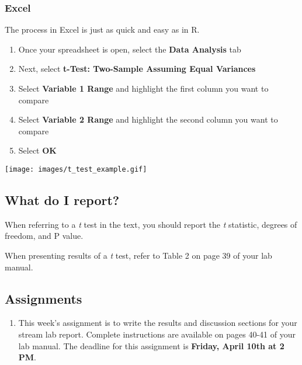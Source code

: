 \documentclass[]{book}
\providecommand{\tightlist}{%
  \setlength{\itemsep}{0pt}\setlength{\parskip}{0pt}}
\begin{document}
\subsubsection{Excel}\label{excel}

The process in Excel is just as quick and easy as in R.

\begin{enumerate}
\def\labelenumi{\arabic{enumi}.}
\tightlist
\item
  Once your spreadsheet is open, select the \textbf{Data Analysis} tab
\item
  Next, select \textbf{t-Test: Two-Sample Assuming Equal Variances}
\item
  Select \textbf{Variable 1 Range} and highlight the first column you
  want to compare
\item
  Select \textbf{Variable 2 Range} and highlight the second column you
  want to compare
\item
  Select \textbf{OK}
\end{enumerate}

\texttt{[image: images/t\_test\_example.gif]}

\subsection{What do I report?}\label{what-do-i-report}

When referring to a \emph{t} test in the text, you should report the
\emph{t} statistic, degrees of freedom, and P value.

When presenting results of a \emph{t} test, refer to Table 2 on page 39
of your lab manual.

\subsection{Assignments}\label{assignments-2}

\begin{enumerate}
\def\labelenumi{\arabic{enumi}.}
\tightlist
\item
  This week's assignment is to write the results and discussion sections
  for your stream lab report. Complete instructions are available on
  pages 40-41 of your lab manual. The deadline for this assignment is
  \textbf{Friday, April 10th at 2 PM}.
\end{enumerate}


\end{document}

